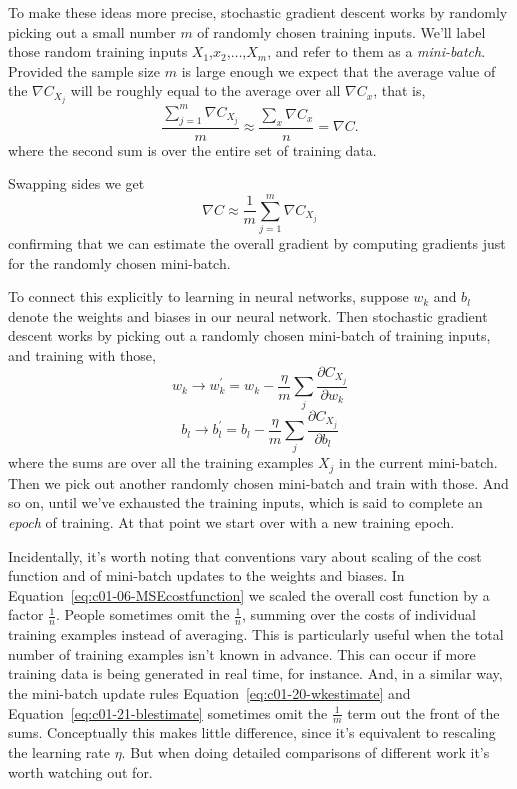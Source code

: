 To make these ideas more precise, stochastic gradient descent works by randomly picking out a small number $m$ of randomly chosen training inputs. We'll label those random training inputs $X_1$,$x_2$,$\ldots$,$X_m$, and refer to them as a \textit{mini-batch}. Provided the sample size $m$ is large enough we expect that the average value of the $\nabla C_{X_j}$ will be roughly equal to the average over all $\nabla C_{x}$, that is, 
\begin{equation}
\frac{\sum_{j=1}^{m} \nabla C_{X_{j}}}{m} \approx \frac{\sum_{x} \nabla C_{x}}{n}=\nabla C.
\label{eq:c01-18-nablaC}
\end{equation}
where the second sum is over the entire set of training data. 

Swapping sides we get 
\begin{equation}
\nabla C \approx \frac{1}{m} \sum_{j=1}^{m} \nabla C_{X_{j}}
\label{eq:c01-19-nablaC}
\end{equation}
confirming that we can estimate the overall gradient by computing gradients just for the randomly chosen mini-batch. 

To connect this explicitly to learning in neural networks, suppose $w_k$ and $b_l$ denote the weights and biases in our neural network. Then stochastic gradient descent works by picking out a randomly chosen mini-batch of training inputs, and training with those, 
\begin{equation}
w_{k} \rightarrow w_{k}^{\prime}=w_{k}-\frac{\eta}{m} \sum_{j} \frac{\partial C_{X_{j}}}{\partial w_{k}}
\label{eq:c01-20-wkestimate}
\end{equation}
\begin{equation}
b_{l} \rightarrow b_{l}^{\prime}=b_{l}-\frac{\eta}{m} \sum_{j} \frac{\partial C_{X_{j}}}{\partial b_{l}}
\label{eq:c01-21-blestimate}
\end{equation}
where the sums are over all the training examples $X_j$ in the current mini-batch. Then we pick out another randomly chosen mini-batch and train with those. And so on, until we've exhausted the training inputs, which is said to complete an \textit{epoch} of training. At that point we start over with a new training epoch.

Incidentally, it's worth noting that conventions vary about scaling of the cost function and of mini-batch updates to the weights and biases. In Equation~\ref{eq:c01-06-MSEcostfunction} we scaled the overall cost function by a factor $\frac{1}{n}$. People sometimes omit the $\frac{1}{n}$, summing over the costs of individual training examples instead of averaging. This is particularly useful when the total number of training examples isn't known in advance. This can occur if more training data is being generated in real time, for instance. And, in a similar way, the mini-batch update rules Equation~\ref{eq:c01-20-wkestimate} and Equation~\ref{eq:c01-21-blestimate} sometimes omit the  $\frac{1}{m}$ term out the front of the sums. Conceptually this makes little difference, since it's equivalent to rescaling the learning rate $\eta$. But when doing detailed comparisons of different work it's worth watching out for.


